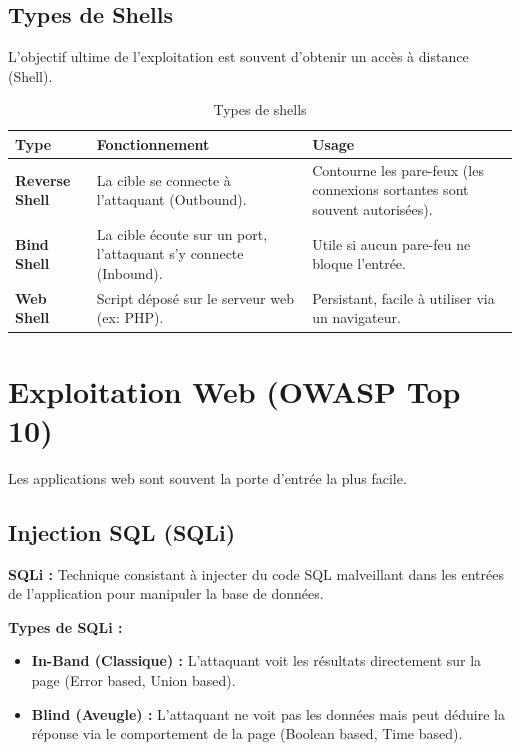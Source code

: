 \begin{boxlizbiz}
{\subsection{Types de Shells}

L'objectif ultime de l'exploitation est souvent d'obtenir un accès à distance (Shell).

\begin{table}[h!]
\centering
\begin{tabular}{p{3cm}p{5cm}p{4cm}}
    \toprule
    \textbf{Type} & \textbf{Fonctionnement} & \textbf{Usage} \\
    \midrule
    \textbf{Reverse Shell} & La cible se connecte à l'attaquant (Outbound). & Contourne les pare-feux (les connexions sortantes sont souvent autorisées). \\
    \textbf{Bind Shell} & La cible écoute sur un port, l'attaquant s'y connecte (Inbound). & Utile si aucun pare-feu ne bloque l'entrée. \\
    \textbf{Web Shell} & Script déposé sur le serveur web (ex: PHP). & Persistant, facile à utiliser via un navigateur. \\
    \bottomrule
\end{tabular}
\caption{Types de shells}
\end{table}

\section{Exploitation Web (OWASP Top 10)}

Les applications web sont souvent la porte d'entrée la plus facile.

\subsection{Injection SQL (SQLi)}

\begin{boxdef}
\textbf{SQLi :} Technique consistant à injecter du code SQL malveillant dans les entrées de l'application pour manipuler la base de données.
\end{boxdef}

\textbf{Types de SQLi :}
\begin{itemize}
    \item \textbf{In-Band (Classique) :} L'attaquant voit les résultats directement sur la page (Error based, Union based).
    \item \textbf{Blind (Aveugle) :} L'attaquant ne voit pas les données mais peut déduire la réponse via le comportement de la page (Boolean based, Time based).
\end{itemize}

}
\end{boxlizbiz}
